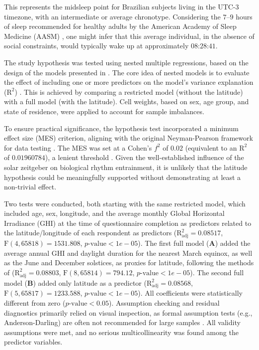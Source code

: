 \documentclass[
12pt,
openright,
oneside,
a4paper,
chapter=TITLE,
section=TITLE,
french,
spanish,
brazil,
english
]{abntex2}
\begin{document}
This represents the midsleep point for Brazilian subjects living in the
UTC-3 timezone, with an intermediate or average chronotype. Considering
the \(7–9\) hours of sleep recommended for healthy adults by the
American Academy of Sleep Medicine (AASM) \autocite{watson2015b}, one
might infer that this average individual, in the absence of social
constraints, would typically wake up at approximately
\(\text{08:28:41}\).

The study hypothesis was tested using nested multiple regressions, based
on the design of the models presented in \textcite{leocadio-miguel2017}.
The core idea of nested models is to evaluate the effect of including
one or more predictors on the model's variance explanation
(\(\text{R}^2\)) \autocite{maxwell2018}. This is achieved by comparing a
restricted model (without the latitude) with a full model (with the
latitude). Cell weights, based on sex, age group, and state of
residence, were applied to account for sample imbalances.

To ensure practical significance, the hypothesis test incorporated a
minimum effect size (MES) criterion, aligning with the original
Neyman-Pearson framework for data testing
\autocite{neyman1928,neyman1928a,perezgonzalez2015}. The MES was set at
a Cohen's \(f^2\) of \(0.02\) (equivalent to an \(\text{R}^2\) of
\(0.01960784\)), a lenient threshold \autocite{cohen1988a}. Given the
well-established influence of the solar zeitgeber on biological rhythm
entrainment, it is unlikely that the latitude hypothesis could be
meaningfully supported without demonstrating at least a non-trivial
effect.

Two tests were conducted, both starting with the same restricted model,
which included age, sex, longitude, and the average monthly Global
Horizontal Irradiance (GHI) at the time of questionnaire completion as
predictors related to the latitude/longitude of each respondent as
predictors (\(\text{R}^2_{\text{adj}} = 0.08517\),
\(\text{F}(4, 65818) = 1531.808\), \(p\text{-value} < 1e-05\)). The
first full model (\textbf{A}) added the average annual GHI and daylight
duration for the nearest March equinox, as well as the June and December
solstices, as proxies for latitude, following the methods of
\textcite{leocadio-miguel2017} (\(\text{R}^2_{\text{adj}} = 0.08803\),
\(\text{F}(8, 65814) = 794.12\), \(p\text{-value} < 1e-05\)). The second
full model (\textbf{B}) added only latitude as a predictor
(\(\text{R}^2_{\text{adj}} = 0.08568\),
\(\text{F}(5, 65817) = 1233.588\), \(p\text{-value} < 1e-05\)). All
coefficients were statistically different from zero
(\(p\text{-value} < 0.05\)). Assumption checking and residual
diagnostics primarily relied on visual inspection, as formal assumption
tests (e.g., Anderson-Darling) are often not recommended for large
samples \autocite{shatz2024}. All validity assumptions were met, and no
serious multicollinearity was found among the predictor variables.
\end{document}
